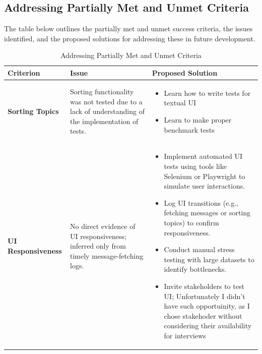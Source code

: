 \documentclass[10pt , a4paper]{report}
\begin{document}
\newpage
\subsection{Addressing Partially Met and Unmet Criteria}

The table below outlines the partially met and unmet success criteria, the issues identified, and the proposed solutions for addressing these in future development.

\begin{table}[h!tbp]
\centering
\renewcommand{\arraystretch}{1.3}
\begin{adjustbox}{max width=\textwidth}
\begin{tabular}{|p{3.5cm}|p{6.5cm}|p{5.5cm}|}
\hline
\textbf{Criterion} & \textbf{Issue} & \textbf{Proposed Solution} \\ \hline

\textbf{Sorting Topics} & 
Sorting functionality was not tested due to a lack of understanding of the implementation of tests. &
\begin{itemize}
  \item Learn how to write tests for textual UI
  \item Learn to make proper benchmark tests
\end{itemize} \\ \hline

\textbf{UI Responsiveness} & 
No direct evidence of UI responsiveness; inferred only from timely message-fetching logs. &
\begin{itemize}
    \item Implement automated UI tests using tools like Selenium or Playwright to simulate user interactions.
    \item Log UI transitions (e.g., fetching messages or sorting topics) to confirm responsiveness.
    \item Conduct manual stress testing with large datasets to identify bottlenecks.
    \item Invite stakeholders to test UI; Unfortunately I didn't have such opportuinity, as I chose stakehoder without considering their availability for interviews
\end{itemize} \\ \hline

\end{tabular}
\end{adjustbox}
\caption{Addressing Partially Met and Unmet Criteria}
\label{tab:addressing-criteria}
\end{table}
\end{document}

